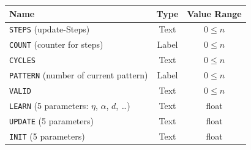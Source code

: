 {\newpage
\clearpage
\samepage {}
}

{\newpage
\clearpage
\samepage {}
}

{\newpage
\clearpage
\samepage {}
}

{\newpage
\clearpage
\samepage {}
}

{\newpage
\clearpage
\samepage \begin{figure}[htbp]
\begin{center}
  \begin{minipage}{\textwidth}
  \end{minipage}

\label{ControlPanel}
\end{center}
\end{figure}
}

{\newpage
\clearpage
\samepage \begin{table}%
[htbp]
\begin{center}
\begin{tabular}{|l|c|c|}
\hline
Name                            & Type  & Value Range\\  \hline
{\tt STEPS} (update-Steps)            & Text  & $0 \le n$\\ 
{\tt COUNT} (counter for steps)       & Label & $0 \le n$\\ 
{\tt CYCLES}                          & Text & $0 \le n$\\ 
{\tt PATTERN} (number of current pattern)                     & Label & $0 \le n$\\ 
{\tt VALID}                           & Text & $0 \le n$\\ 
{\tt LEARN} (5 parameters: $\eta$, $\alpha$, $d$, \ldots)     & Text & float\\ 
{\tt UPDATE} (5 parameters)                                   & Text & float\\ 
{\tt INIT} (5 parameters)                                   & Text & float\\ 
\hline
\end{tabular}
\end{center}

\label{TabControlPanelItem}
\end{table}
}

{\newpage
\clearpage
\samepage {}
}

{\newpage
\clearpage
\samepage {}
}

